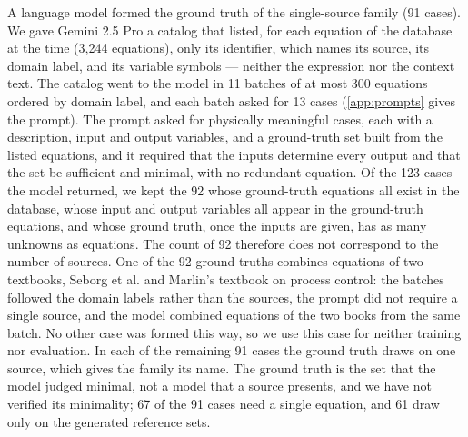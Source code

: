 A language model formed the ground truth of the single-source family (91 cases). We gave Gemini
2.5 Pro a catalog that listed, for each equation of the database at the time (3,244 equations),
only its identifier, which names its source, its domain label, and its variable symbols --- neither
the expression nor the context text. The catalog went to the model in 11 batches of at most 300
equations ordered by domain label, and each batch asked for 13 cases (\ref{app:prompts}
gives the prompt). The prompt asked for physically meaningful cases, each with a description,
input and output variables, and a ground-truth set built from the listed equations, and it
required that the inputs determine every output and that the set be sufficient and minimal, with
no redundant equation. Of the 123 cases the model returned, we kept the 92 whose ground-truth
equations all exist in the database, whose input and output variables all appear in the
ground-truth equations, and whose ground truth, once the inputs are given, has as many unknowns as
equations. The count of 92 therefore does not correspond to the number of sources. One of the 92
ground truths combines equations of two textbooks, Seborg et al.\cite{Seborg} and Marlin's textbook
on process control: the batches followed the domain labels rather than the sources, the prompt did
not require a single source, and the model combined equations of the two books from the same batch.
No other case was formed this way, so we use this case for neither training nor evaluation. In each
of the remaining 91 cases the ground truth draws on one source, which gives the family its name.
The ground truth is the set that the model judged minimal, not a model that a source presents, and
we have not verified its minimality; 67 of the 91 cases need a single equation, and 61 draw only on
the generated reference sets.

